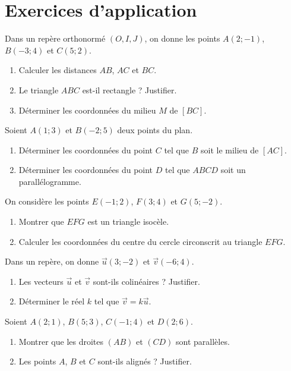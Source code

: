 \section{Exercices d'application}


\exo{}
Dans un repère orthonormé $(O, I, J)$, on donne les points $A(2; -1)$, $B(-3; 4)$ et $C(5; 2)$.
\begin{enumerate}[label=\alph*)]
    \item Calculer les distances $AB$, $AC$ et $BC$.
    \item Le triangle $ABC$ est-il rectangle ? Justifier.
    \item Déterminer les coordonnées du milieu $M$ de $[BC]$.
\end{enumerate}

\exo{}
Soient $A(1; 3)$ et $B(-2; 5)$ deux points du plan.
\begin{enumerate}[label=\alph*)]
    \item Déterminer les coordonnées du point $C$ tel que $B$ soit le milieu de $[AC]$.
    \item Déterminer les coordonnées du point $D$ tel que $ABCD$ soit un parallélogramme.
\end{enumerate}

\exo{}
On considère les points $E(-1; 2)$, $F(3; 4)$ et $G(5; -2)$.
\begin{enumerate}[label=\alph*)]
    \item Montrer que $EFG$ est un triangle isocèle.
    \item Calculer les coordonnées du centre du cercle circonscrit au triangle $EFG$.
\end{enumerate}


\exo{}
Dans un repère, on donne $\vec{u}(3; -2)$ et $\vec{v}(-6; 4)$.
\begin{enumerate}[label=\alph*)]
    \item Les vecteurs $\vec{u}$ et $\vec{v}$ sont-ils colinéaires ? Justifier.
    \item Déterminer le réel $k$ tel que $\vec{v} = k\vec{u}$.
\end{enumerate}

\exo{}
Soient $A(2; 1)$, $B(5; 3)$, $C(-1; 4)$ et $D(2; 6)$.
\begin{enumerate}[label=\alph*)]
    \item Montrer que les droites $(AB)$ et $(CD)$ sont parallèles.
    \item Les points $A$, $B$ et $C$ sont-ils alignés ? Justifier.
\end{enumerate}

